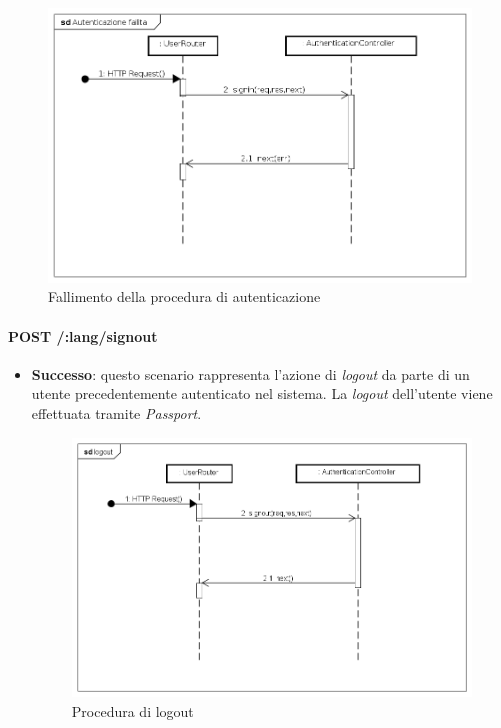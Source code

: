 \begin{itemize}
\label{Fallimento della procedura di autenticazione}
\begin{figure}[ht]
	\centering
	\includegraphics[scale=0.40]{UML/DiagrammiDiSequenza/Back-end/POST__lang_signin_failure.png}
	\caption{Fallimento della procedura di autenticazione}
\end{figure}
\FloatBarrier

\end{itemize}

\paragraph{POST /:lang/signout}
\begin{itemize}
\item \textbf{Successo}: questo scenario rappresenta l'azione di \textit{logout} da parte di un utente precedentemente autenticato nel sistema. La \textit{logout} dell'utente viene effettuata tramite \textit{Passport}.

\label{Procedura di logout}
\begin{figure}[ht]
	\centering
	\includegraphics[scale=0.40]{UML/DiagrammiDiSequenza/Back-end/POST__lang_signout_success.png}
	\caption{Procedura di logout}
\end{figure}
\FloatBarrier

\end{itemize}

